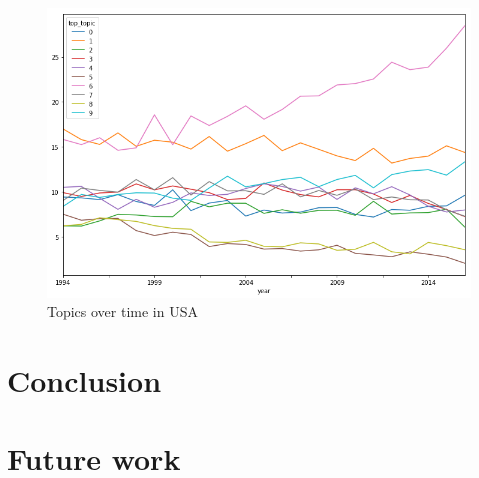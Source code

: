 \documentclass[12pt]{report}
\begin{document}
\begin{center}
\begin{figure}
\includegraphics[width=1.0\textwidth, natwidth=707,natheight=483]
{figs/topic-evolution-usa.png}
\caption{Topics over time in USA}
\end{figure}
\end{center}



\section{Conclusion}

\section{Future work}

{}

\end{document}
